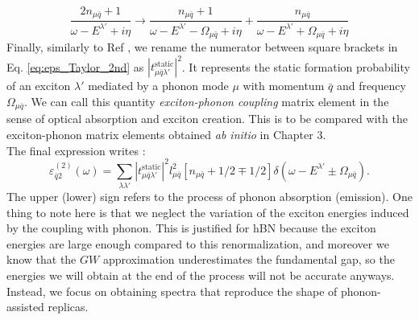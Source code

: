 \begin{equation}
	\frac{2n_{\mu\bar{q}} + 1}{\omega - E^{\lambda'} + i\eta} \to \frac{n_{\mu\bar{q}} + 1}{\omega - E^{\lambda'} - \Omega_{\mu\bar{q}} + i\eta} + \frac{n_{\mu\bar{q}}}{\omega - E^{\lambda'} + \Omega_{\mu\bar{q}} + i\eta}
\end{equation}
Finally, similarly to Ref \cite{paleari2019exciton}, we rename the numerator between square brackets in Eq. \eqref{eq:eps_Taylor_2nd} as $|t^{\text{static}}_{\mu\bar{q}\lambda'}|^2$. It represents the static formation probability of an exciton $\lambda'$ mediated by a phonon mode $\mu$ with momentum $\bar{q}$ and frequency $\Omega_{\mu\bar{q}}$. We can call this quantity \textit{exciton-phonon coupling} matrix element in the sense of optical absorption and exciton creation. This is to be compared with the exciton-phonon matrix elements obtained \textit{ab initio} in Chapter 3.\\
The final expression writes :
\begin{equation}
	\varepsilon^{(2)}_{\bar{q}2}(\omega) = \sum_{\lambda\lambda'} |t^{\text{static}}_{\mu\bar{q}\lambda'}|^2 l^2_{\mu\bar{q}} \left[ n_{\mu\bar{q}} + 1/2 \mp 1/2 \right] \delta(\omega - E^{\lambda'} \pm \Omega_{\mu\bar{q}}). \label{eq:eps2_fdd}
\end{equation}
The upper (lower) sign refers to the process of phonon absorption (emission). One thing to note here is that we neglect the variation of the exciton energies induced by the coupling with phonon. This is justified for hBN because the exciton energies are large enough compared to this renormalization, and moreover we know that the $GW$ approximation underestimates the fundamental gap, so the energies we will obtain at the end of the process will not be accurate anyways. Instead, we focus on obtaining spectra that reproduce the shape of phonon-assisted replicas.

%
